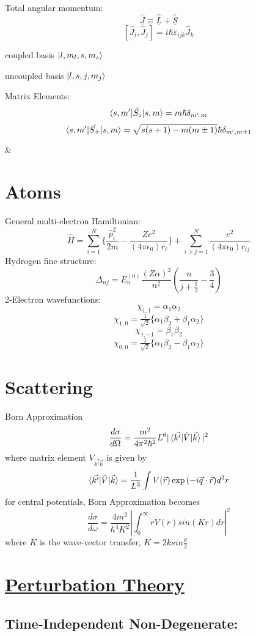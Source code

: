 \documentclass[table,cmyk]{article}
\begin{document}
\begin{longtable}
{\begin{minipage}{7.4cm}
\end{minipage}
}
\vspace{0.3cm}

Total angular momentum:
\[ \hat{\underline{J}} \equiv \hat{\underline{L}}+\hat{\underline{S}}\]
\[[\hat{J}_i,\hat{J}_j] = i\hbar \varepsilon_{ijk}\hat{J}_k\]
\begin{center}
{\centering

coupled basis $\ket{l, m_l, s, m_s}$ 

uncoupled basis $\ket{l, s, j, m_j}$}
\end{center}{}

Matrix Elements:
\[\braket{s,m'|\hat{S_z}|s,m} = m\hbar \delta_{m',m}\]
\[\braket{s,m'|\hat{S_{\pm}}|s,m} = \sqrt{s(s+1)-m(m\pm1)} \hbar \delta_{m',m\pm1}\]

&
\section*{Atoms}


General multi-electron Hamiltonian:
\[\hat{H} = \sum_{i=1}^{N} \Big\{ \frac{\hat{p}_i^2}{2m}-\frac{Ze^2}{(4\pi\epsilon_0)r_i}\Big\} + \sum_{i>j=1}^{N} \frac{e^2}{(4\pi\epsilon_0)r_{ij}}\]
Hydrogen fine structure:
\[\Delta_{nj} = E^{(0)}_n \frac{(Z\alpha)^2}{n^2}\left( \frac{n}{j+\tfrac{1}{2}}-\frac{3}{4}\right)\]
2-Electron wavefunctions:
\[\chi_{1,1} = \alpha_1\alpha_2\]
\[\chi_{1,0} = \tfrac{1}{\sqrt{2}}\{\alpha_1\beta_2+\beta_1\alpha_2\}\]
\[\chi_{1,-1} = \beta_1\beta_2\]
\[\chi_{0,0} = \tfrac{1}{\sqrt{2}}\{\alpha_1\beta_2-\beta_1\alpha_2\}\]

\section*{Scattering}
Born Approximation
\[\frac{d \sigma}{d \Omega} =\frac{m^2}{4\pi^2\hbar^2}L^6|\braket{\vec{k'}|\hat{V}|\vec{k}}|^2\]
where matrix element $V_{\vec{k'}\vec{k}}$ is given by
\[\braket{\vec{k'}|\hat{V}|\vec{k}} = \frac{1}{L^3}\int V(\vec{r})\exp{(-i\vec{q}\cdot \vec{r})}d^3r\]
for central potentials, Born Approximation becomes
\[\frac{d\sigma}{d\omega} = \frac{4m^2}{\hbar^4K^2}\left|\int_{0}^{\infty} rV(r)sin(Kr)dr\right|^2\]
where $K$ is the wave-vector transfer, $K = 2ksin\frac{\theta}{2}$
\tabularnewline\hline
\section*{\underline{Perturbation Theory}}

\subsection*{Time-Independent Non-Degenerate:}


\end{longtable}
\end{document}
